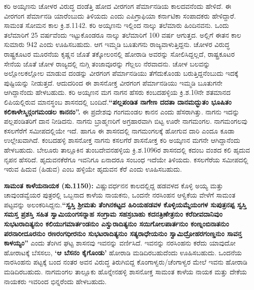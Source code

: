 ಕರಿ ಅಯ್ಕಣನು ಚೋಳರ ವಿರುದ್ಧ ದಂಡೆತ್ತಿ ಹೋದ ವೀರಗಂಗ ಪೆರ್ಮಾನಡಿಯ ಕಾಲದವನೆಂದು ಹೇಳಿದೆ. ಈ ವೀರಗಂಗ ಪೆರ್ಮಾನಡಿ ಯಾರೆಂಬುದು ತಿಳಿಯದು ಎಂದು ಎಪಿಗ್ರಾಫಿಯಾ ಕರ್ನಾಟಿಕಾ ಸಂಪಾದಕರು ಹೇಳಿದ್ದಾರೆ. ಸಾಮಂತ ಸೋಮನ ಕಾಲ ಕ್ರಿ.ಶ.1142. ಕರಿ ಅಯ್ಕಣನು ಇಲ್ಲಿಂದ ನಾಲ್ಕು ತಲೆಮಾರು ಹಿಂದಿನವನು. ಒಂದು ತಲೆಮಾರಿಗೆ 25 ವರ್ಷವೆಂದು ಇಟ್ಟುಕೊಂಡರೂ ನಾಲ್ಕು ತಲೆಮಾರಿಗೆ 100 ವರ್ಷ ಆಗುತ್ತದ. ಅಲ್ಲಿಗೆ ಈತನ ಕಾಲ ಸುಮಾರು 942 ಎಂದು ಊಹಿಸಬಹುದು. ಆಗ ಇಮ್ಮಡಿ ಬೂತುಗನು ರಾಜ್ಯವಾಳುತ್ತಿದ್ದನು. ಚೋಳರ ವಿರುದ್ಧ ರಾಷ್ಟ್ರಕೂಟರ ಮೂರನೆಯ ಕೃಷ್ಣನ ಜೊತೆ ತಕ್ಕೋಲಂನಲ್ಲಿ ಹೋರಾಡಿ ಅವರನ್ನು ಸೋಲಿಸಿದ್ದಲ್ಲದೆ, ರಾಷ್ಟ್ರಕೂಟರ ಸೇನೆಯ ಜೊತೆ ಚೋಳ ರಾಜ್ಯದಲ್ಲಿ ನುಗ್ಗಿ ತಂಜಾವೂರನ್ನು ಗೆಲ್ಲಲು ನೆರವಾದನು. ಚೋಳ ಬಲವನ್ನು ಅಲ್ಲೋಲಕಲ್ಲೋಲ ಮಾಡುವ ದಂಡನ್ನು ವೀರಗಂಗ ಪೆರ್ಮಾನಡಿಯು ತೆಗೆದುಕೊಂಡು ಬರುತ್ತಿದ್ದನೆಂಬುದು ಇದಕ್ಕೆ ಪುಷ್ಟಿಯನ್ನು ನೀಡುತ್ತದೆ. ಆದುದರಿಂದ ಈ ಶಾಸನೋಕ್ತ ವೀರಗಂಗ ಪೆರ್ಮಾನಡಿಯು ಇಮ್ಮಡಿ ಬೂತುಗನೇ ಆಗಿದ್ದಾನೆಂದು ಹೇಳಬಹುದು. ಕರಿ ಅಯ್ಕಣನ ಮಗ ನಾಗನ ಹೆಸರು ಕಂಬದಹಳ್ಳಿಯ ಕ್ರಿ.ಶ.10ನೇ ಶತಮಾನದ ಲಿಪಿಯಲ್ಲಿರುವ ಮಾನಸ್ಥಂಬ ಶಾಸನದಲ್ಲಿ ಬಂದಿದೆ.\textbf{“ಪಲ್ಲಪಂಡಿತ ನಾಗೇಣ ದದತಾ ದಾನಮದ್ಭುತಂ ಭೂಷಿತಂ ಕಲಿಕಾಳೇಸ್ಮಿನ್ಗಂಗಮಂಡಲ ಕಾನನಂ”.} ಈ ಪ್ರದೇಶವು ಗಂಗಮಂಡಲ ಕಾನನ ಎಂದು ಹೆಸರಾಗಿತ್ತು. ನಾಗನು ಇದನ್ನು ಪಲ್ಲಪಂಡಿತರಿಗೆ ದಾನ ನೀಡಿದನು. ನಾಗನು ಬ್ರಾಹ್ಮಣರಿಗೆ ಅಗ್ರಹಾರವಾಗಿ ಬಿಟ್ಟ ಊರೇ ನಾಗಮಂಗಲ. ನಾಗಮಂಗಲವು ಕಸಲಗೆರೆಗೆ ಸಮೀಪದಲ್ಲಿಯೇ ಇದೆ. ಹಾಗೂ ಈ ಶಾಸನದಲ್ಲಿ ನಾಗಮಂಗಲಕ್ಕೆ ಹೋಗುವ ದಾರಿ ಎಂದೂ ಕೂಡಾ ಉಲ್ಲೇಖವಾಗಿದೆ. ಕಂಬದಹಳ್ಳಿ ಶಾಸನೋಕ್ತ ನಾಗನು ಕಸಲಗೆರೆ ಶಾಸನೋಕ್ತ ಕರಿ ಅಯ್ಕಣನ ಮಗನೇ ಆಗಿದ್ದಾನೆಂದು ಹೇಳಬಹುದು. ಬೇಲೂರು ತಾಲ್ಲೂಕಿನ ತುಂಬದೇವನಹಳ್ಳಿಯ ಕ್ರಿ.ಶ.1096ರ ಶಾಸನದಲ್ಲಿ ಕದಂಬ ವಂಶದ ಕಲಿ ಹೃದುವ ನೃಪನ ಹೆಸರಿದೆ. ಹೃದುವನಕೆರೆಗೂ ಇವನಿಗೂ ಏನಾದರೂ ಸಂಬಂಧ ಇದೆಯೇ ತಿಳಿಯದು. ಕಸಲಗೆರೆಯ ಸಮೀಪದಲ್ಲಿ ಇರುವ ಹಿದುವ (ಹಿಡುವ) ಎಂಬ ಹಳ್ಳಿಯೇ ಹೃದುವನ ಕೆರೆ ಎಂದು ಊಹಿಸಬಹುದು.

\textbf{ಸಾಮಂತ ಕಾಳೆಯನಾಯಕ (ಸು.1150):} ವಿಷ್ಣುವರ್ಧನನ ಕಾಲದಲ್ಲಿದ್ದ ಹಡವಳದ ಕೊಳ್ಳಿ ಅಯ್ಯ ಮತ್ತು ಚಾವುಂಡವ್ವೆ\-ಯರ ಪುತ್ರರಲ್ಲಿ ಒಬ್ಬನಾದ ಕಾಳೆಯ ನಾಯಕನು, ಒಂದನೇ ನರಸಿಂಹನ ಆಳ್ವಿಕೆಯ ವೇಳೆಗೆ ಸಾಮಂತ ಪಟ್ಟವನ್ನು ಅಲಂಕರಿಸಿದ್ದನು.\textbf{“ಸ್ವಸ್ತಿ ಶ‍್ರೀಮತು ತೆಂಗಿನಕಟ್ಟದ ಹಿರಿಯಹಡವಳ ಕೊಳ್ಳಿಯಮ್ಮೆಯಂಗಳ ಸುಪುತ್ರನಪ್ಪ ಸ್ವಸ್ತಿ ಸಮಸ್ತ ಪ್ರಶಸ್ತಿ ಸಹಿತ ಸ್ವಾಮಿಯಂಗಸನ್ನಾಹ ಸಂಗ್ರಾಮ ಸಹಸ್ರಬಾಹು ಕದನತ್ರಿಣೇತ್ರನುಂ ಕರೆದೀವದಾನಿವುಂ ಸುಭಟರಾದಿತ್ಯನುಂ ಕಲಿಯುಗಮಾರ್ತಂಡನುಂ ಎಸ್ವುರಾದಿತ್ಯನುಂ ಸಯಿಗೋಲಪಾರ್ತನುಂ ಕಂಣ್ನಂಬಿನಾತನುಂ ಪರನಾರೀದೂರನುಂ ರಣರಂಗಧೀರನುಂ ಸುಭಟರಾದಿತ್ಯನುಂ ಸತ್ಯರಾಧೇಯನುಂ ಸ್ವಾಮಿದ್ರೋಹರಗಂಣ್ಡನುಂ ಸಾವನ್ತ ಕಾಳಯ್ಯಂ”} ಎಂದು ತೆಂಗಿನ ಘಟ್ಟ ಶಾಸನವು ಇವನನ್ನು ವರ್ಣಿಸಿದೆ. ಇವನನ್ನು ನರಸಿಂಹನು ಕರೆದು ಯಾವುದೋ ಹೋರಾಟಕ್ಕೆ ಬೆಸಸಲು, \textbf{‘ಆ ಬೆಸನಂ ಕೈಗೊಂಡು’} ಹೋರಾಡಿ ಮಡಿದಿರಬಹುದೆಂದು ಊಹಿಸಬಹುದು. ಒಂದನೆಯ ನಾರಸಿಂಹನು ಪಟ್ಟಕ್ಕೆ ಬಂದ ನಂತರ ಅವನ ವಿರುದ್ಧ ತಿರುಗಿಬಿದ್ದ ಕೊಂಗಾಳ್ವರು/ಚೆಂಗಾಳ್ವರ ಮೇಲೆ ಇವನು ಹೋರಾಡಿ ಮಡಿದಿರಬಹುದು. ನಾಗಮಂಗಲ ತಾಲ್ಲೂಕು ಹೊನ್ನೇನಹಳ್ಳಿ ಶಾಸನೋಕ್ತ ಸಾಮಂತ ಕಾಳೆಯ ನಾಯಕ ಮತ್ತು ದೇಕೆಯ ನಾಯಕರು ಇವರಿಂದ ಭಿನ್ನರೆಂದು ಹೇಳಬಹುದು.

